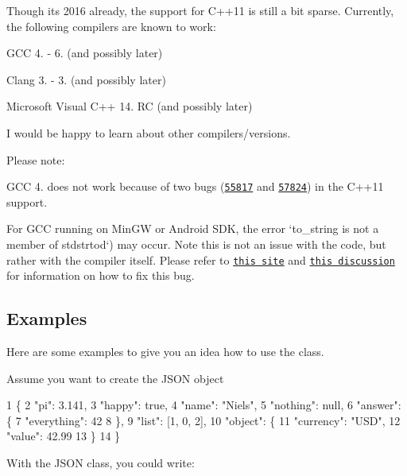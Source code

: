 Though it\textquotesingle{}s 2016 already, the support for C++11 is still a bit sparse. Currently, the following compilers are known to work\+:


\begin{DoxyItemize}
\item G\+CC 4. -\/ 6. (and possibly later)
\item Clang 3. -\/ 3. (and possibly later)
\item Microsoft Visual C++ 14. RC (and possibly later)
\end{DoxyItemize}

I would be happy to learn about other compilers/versions.

Please note\+:


\begin{DoxyItemize}
\item G\+CC 4. does not work because of two bugs (\href{https://gcc.gnu.org/bugzilla/show_bug.cgi?id=55817}{\tt 55817} and \href{https://gcc.gnu.org/bugzilla/show_bug.cgi?id=57824}{\tt 57824}) in the C++11 support.
\item For G\+CC running on Min\+GW or Android S\+DK, the error `\textquotesingle{}to\+\_\+string\textquotesingle{} is not a member of \textquotesingle{}stdstrtod`) may occur. Note this is not an issue with the code, but rather with the compiler itself. Please refer to \href{http://tehsausage.com/mingw-to-string}{\tt this site} and \href{https://github.com/nlohmann/json/issues/136}{\tt this discussion} for information on how to fix this bug.
\end{DoxyItemize}

\subsection*{Examples}

Here are some examples to give you an idea how to use the class.

Assume you want to create the J\+S\+ON object


\begin{DoxyCode}
1 \{
2   "pi": 3.141,
3   "happy": true,
4   "name": "Niels",
5   "nothing": null,
6   "answer": \{
7     "everything": 42
8   \},
9   "list": [1, 0, 2],
10   "object": \{
11     "currency": "USD",
12     "value": 42.99
13   \}
14 \}
\end{DoxyCode}


With the J\+S\+ON class, you could write\+:


